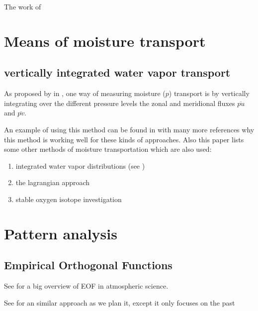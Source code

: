 The work of \citeauthor{precipitation_seasonality}

\section{Means of moisture transport}

\subsection{vertically integrated water vapor transport}

As proposed by \citeauthor{AProposedAlgorithmforMoistureFluxesfromAtmosphericRivers} in \cite{AProposedAlgorithmforMoistureFluxesfromAtmosphericRivers}, one way of measuring moisture ($p$) transport is by vertically integrating over the different pressure levels the zonal and meridional fluxes $\overline{pu}$ and $\overline{pv}$. 

An example of using this method can be found in \cite{Ayantobo2021IntegratedMT} with many more references why this method is working well for these kinds of approaches. 
Also this paper lists some other methods of moisture transportation which are also used:

\begin{enumerate}
  \item integrated water vapor distributions (see \cite{gimeno2014atmospheric_rivers_review})
  \item the lagrangian approach
  \item stable oxygen isotope investigation
\end{enumerate}



\section{Pattern analysis}

\subsection{Empirical Orthogonal Functions}

See \cite{hannachi2007eof_review} for a big overview of EOF in atmospheric science.

See \cite{Ayantobo2021IntegratedMT} for an similar approach as we plan it, except it only focuses on the past
